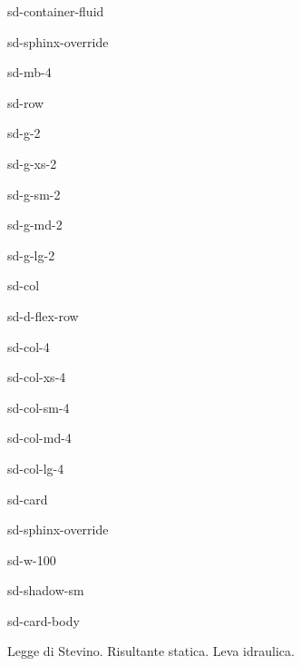 \documentclass[letterpaper,10pt,italian]{jupyterBook}
\begin{document}
\begin{sphinxuseclass}{sd-container-fluid}
\begin{sphinxuseclass}{sd-sphinx-override}
\begin{sphinxuseclass}{sd-mb-4}
\begin{sphinxuseclass}{sd-row}
\begin{sphinxuseclass}{sd-g-2}
\begin{sphinxuseclass}{sd-g-xs-2}
\begin{sphinxuseclass}{sd-g-sm-2}
\begin{sphinxuseclass}{sd-g-md-2}
\begin{sphinxuseclass}{sd-g-lg-2}
\begin{sphinxuseclass}{sd-col}
\begin{sphinxuseclass}{sd-d-flex-row}
\begin{sphinxuseclass}{sd-col-4}
\begin{sphinxuseclass}{sd-col-xs-4}
\begin{sphinxuseclass}{sd-col-sm-4}
\begin{sphinxuseclass}{sd-col-md-4}
\begin{sphinxuseclass}{sd-col-lg-4}
\begin{sphinxuseclass}{sd-card}
\begin{sphinxuseclass}{sd-sphinx-override}
\begin{sphinxuseclass}{sd-w-100}
\begin{sphinxuseclass}{sd-shadow-sm}
\begin{sphinxuseclass}{sd-card-body}

\end{sphinxuseclass}
\end{sphinxuseclass}
\end{sphinxuseclass}
\end{sphinxuseclass}
\end{sphinxuseclass}
\end{sphinxuseclass}
\end{sphinxuseclass}
\end{sphinxuseclass}
\end{sphinxuseclass}
\end{sphinxuseclass}
\end{sphinxuseclass}
\end{sphinxuseclass}
\end{sphinxuseclass}
\end{sphinxuseclass}
\end{sphinxuseclass}
\end{sphinxuseclass}
\end{sphinxuseclass}
\end{sphinxuseclass}
\end{sphinxuseclass}
\end{sphinxuseclass}
\end{sphinxuseclass}
\sphinxAtStartPar
{} Legge di Stevino. Risultante statica. Leva idraulica.
\end{document}

